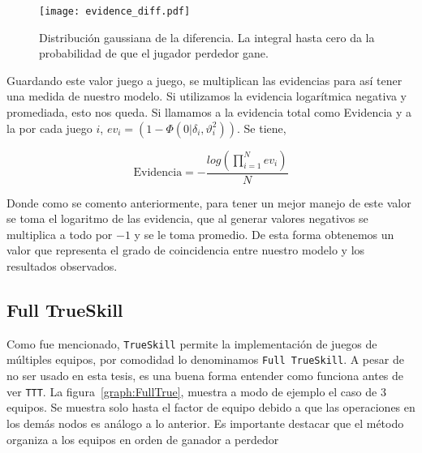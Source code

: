 \documentclass[11pt,twoside,spanish]{report} %
\begin{document}
\begin{figure}[H]
	\centering
	\texttt{[image: evidence\_diff.pdf]}
	\caption{Distribuci\'on gaussiana de la diferencia. La integral hasta cero da la probabilidad de que el jugador perdedor gane.}
	\label{fig:evidenciadiff}
\end{figure}

Guardando este valor juego a juego, se multiplican las evidencias para as\'i tener una medida de nuestro modelo. Si utilizamos la evidencia logar\'itmica negativa y promediada, esto nos queda.
Si llamamos a la evidencia total como Evidencia y a la por cada juego $i$, $ev_i=(1-\Phi(0|\delta_i,\vartheta_i^2))$.
Se tiene,

\begin{equation}
	\text{Evidencia} = -\frac{log(\prod_{i=1}^{N}ev_i)}{N}
\end{equation}  

Donde como se comento anteriormente, para tener un mejor manejo de este valor se toma el logaritmo de las evidencia, que al generar valores negativos se multiplica a todo por $-1$ y se le toma promedio.
De esta forma obtenemos un  valor que representa el grado de coincidencia entre nuestro modelo y los resultados observados.


\subsection{Full TrueSkill}\label{sec:iterative_posterior}


Como fue mencionado, \texttt{TrueSkill} permite la implementaci\'on de juegos de m\'ultiples equipos, por comodidad lo denominamos \texttt{Full TrueSkill}.
A pesar de no ser usado en esta tesis, es una buena forma entender como funciona antes de ver \texttt{TTT}.
La figura~\ref{graph:FullTrue}, muestra a modo de ejemplo el caso de 3 equipos.
Se muestra solo hasta el factor de equipo debido a que las operaciones en los dem\'as nodos es an\'alogo a lo anterior.
Es importante destacar que el m\'etodo organiza a los equipos en orden de ganador a perdedor


\end{document}
